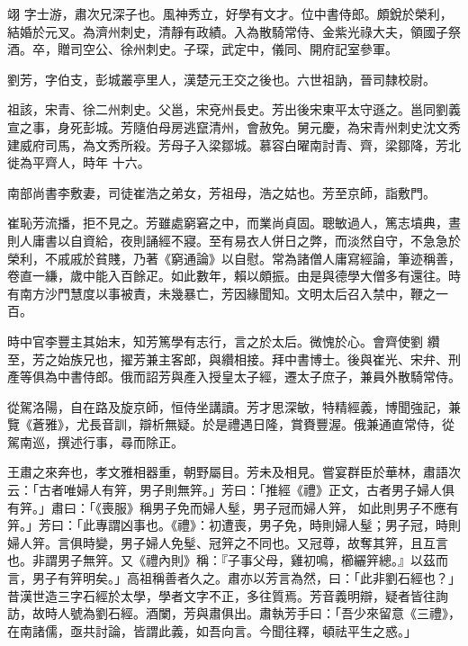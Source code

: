 \begin{pinyinscope}
 翊
 字士游，肅次兄深子也。風神秀立，好學有文才。位中書侍郎。頗銳於榮利，結婚於元叉。為濟州刺史，清靜有政績。入為散騎常侍、金紫光祿大夫，領國子祭酒。卒，贈司空公、徐州刺史。子琛，武定中，儀同、開府記室參軍。



 劉芳，字伯支，彭城叢亭里人，漢楚元王交之後也。六世祖訥，晉司隸校尉。



 祖該，宋青、徐二州刺史。父邕，宋兗州長史。芳出後宋東平太守遜之。邕同劉義宣之事，身死彭城。芳隨伯母房逃竄清州，會赦免。舅元慶，為宋青州刺史沈文秀建威府司馬，為文秀所殺。芳母子入梁鄒城。慕容白曜南討青、齊，梁鄒降，芳北徙為平齊人，時年
 十六。



 南部尚書李敷妻，司徒崔浩之弟女，芳祖母，浩之姑也。芳至京師，詣敷門。



 崔恥芳流播，拒不見之。芳雖處窮窘之中，而業尚貞固。聰敏過人，篤志墳典，晝則人庸書以自資給，夜則誦經不寢。至有易衣人併日之弊，而淡然自守，不急急於榮利，不戚戚於貧賤，乃著《窮通論》以自慰。常為諸僧人庸寫經論，筆迹稱善，卷直一縑，歲中能入百餘疋。如此數年，賴以頗振。由是與德學大僧多有還往。時有南方沙門慧度以事被責，未幾暴亡，芳因緣聞知。文明太后召入禁中，鞭之一百。



 時中官李豐主其始末，知芳篤學有志行，言之於太后。微愧於心。會齊使劉
 纘至，芳之始族兄也，擢芳兼主客郎，與纘相接。拜中書博士。後與崔光、宋弁、刑產等俱為中書侍郎。俄而詔芳與產入授皇太子經，遷太子庶子，兼員外散騎常侍。



 從駕洛陽，自在路及旋京師，恒侍坐講讀。芳才思深敏，特精經義，博聞強記，兼覽《蒼雅》，尤長音訓，辯析無疑。於是禮遇日隆，賞賚豐渥。俄兼通直常侍，從駕南巡，撰述行事，尋而除正。



 王肅之來奔也，孝文雅相器重，朝野屬目。芳未及相見。嘗宴群臣於華林，肅語次云：「古者唯婦人有笄，男子則無笄。」芳曰：「推經《禮》正文，古者男子婦人俱有笄。」肅曰：「《喪服》稱男子免而婦人髽，男子冠而婦人笄，
 如此則男子不應有笄。」芳曰：「此專謂凶事也。《禮》：初遭喪，男子免，時則婦人髽；男子冠，時則婦人笄。言俱時變，男子婦人免髽、冠笄之不同也。又冠尊，故奪其笄，且互言也。非謂男子無笄。又《禮內則》稱：『子事父母，雞初鳴，櫛纚笄總。』以茲而言，男子有笄明矣。」高祖稱善者久之。肅亦以芳言為然，曰：「此非劉石經也？」昔漢世造三字石經於太學，學者文字不正，多往質焉。芳音義明辯，疑者皆往詢訪，故時人號為劉石經。酒闌，芳與肅俱出。肅執芳手曰：「吾少來留意《三禮》，在南諸儒，亟共討論，皆謂此義，如吾向言。今聞往釋，頓祛平生之惑。」




\end{pinyinscope}
